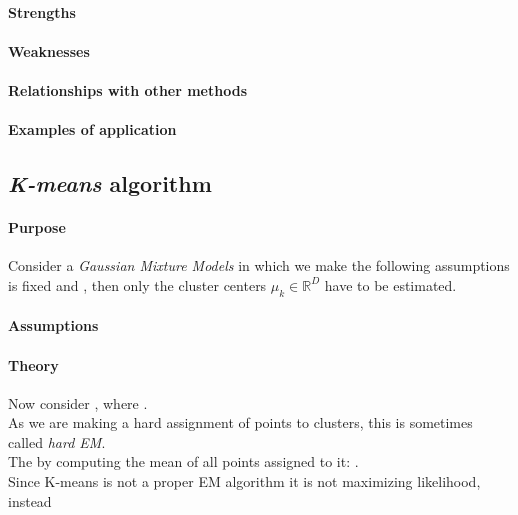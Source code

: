 \paragraph{Strengths}
\paragraph{Weaknesses}
\paragraph{Relationships with other methods}
\paragraph{Examples of application}



\subsection{\emph{K-means} algorithm}
\paragraph{Purpose}
Consider a \emph{Gaussian Mixture Models} in which  we make the following assumptions  is fixed and , then only the cluster 
centers $\mu_{k}\in\mathbb{R}^{D}$ have to be estimated.\\
 
\paragraph{Assumptions}
\paragraph{Theory}
Now consider , where .\\
As we are making a hard assignment of points to clusters, this is sometimes called 
\emph{hard EM}. \\
The  by computing the mean of all points 
assigned to it: .\\
Since K-means is not a proper EM algorithm it is not maximizing likelihood, instead 
